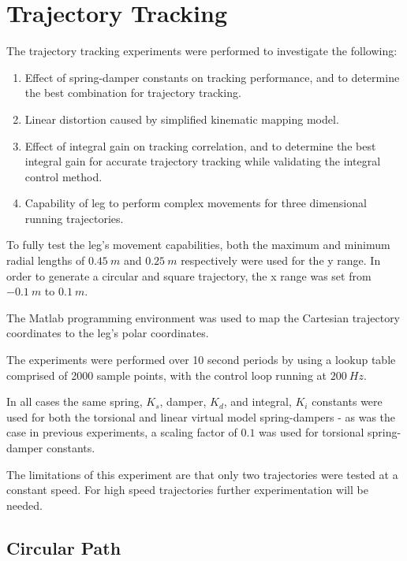 \section{Trajectory Tracking}
\label{sec:Trajectory Tracking}

The trajectory tracking experiments were performed to investigate the following:

\begin{enumerate}
\item Effect of spring-damper constants on tracking performance, and to determine the best combination for trajectory tracking.
\item Linear distortion caused by simplified kinematic mapping model.
\item Effect of integral gain on tracking correlation, and to determine the best integral gain for accurate trajectory tracking while validating the integral control method.
\item Capability of leg to perform complex movements for three dimensional running trajectories.
\end{enumerate}

To fully test the leg's movement capabilities, both the maximum and minimum radial lengths of $0.45\ m$ and $0.25\ m$ respectively were used for the y range. In order to generate a circular and square trajectory, the x range was set from $-0.1\ m$ to $0.1\ m$.

The Matlab programming environment was used to map the Cartesian trajectory coordinates to the leg's polar coordinates.

The experiments were performed over 10 second periods by using a lookup table comprised of 2000 sample points, with the control loop running at $200\ Hz$. 

In all cases the same spring, $K_s$, damper, $K_d$, and integral, $K_i$ constants were used for both the torsional and linear virtual model spring-dampers - as was the case in previous experiments, a scaling factor of $0.1$ was used for torsional spring-damper constants.

The limitations of this experiment are that only two trajectories were tested at a constant speed. For high speed trajectories further experimentation will be needed.

\subsection{Circular Path}
\label{sec:Circular Path}

